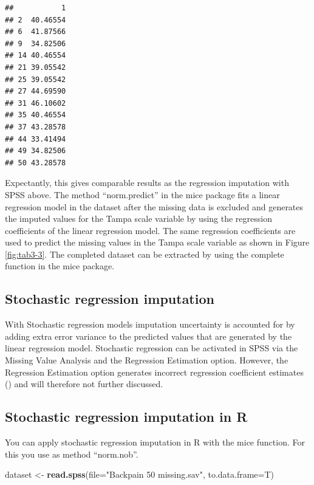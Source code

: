 \documentclass[]{book}
\newenvironment{Shaded}{\begin{snugshade}}{\end{snugshade}}
\newcommand{\KeywordTok}[1]{\textcolor[rgb]{0.13,0.29,0.53}{\textbf{#1}}}
\newcommand{\DataTypeTok}[1]{\textcolor[rgb]{0.13,0.29,0.53}{#1}}
\newcommand{\StringTok}[1]{\textcolor[rgb]{0.31,0.60,0.02}{#1}}
\newcommand{\NormalTok}[1]{#1}
\theoremstyle{definition}
\theoremstyle{definition}
\theoremstyle{definition}
\theoremstyle{remark}
\begin{document}
\begin{verbatim}
##           1
## 2  40.46554
## 6  41.87566
## 9  34.82506
## 14 40.46554
## 21 39.05542
## 25 39.05542
## 27 44.69590
## 31 46.10602
## 35 40.46554
## 37 43.28578
## 44 33.41494
## 49 34.82506
## 50 43.28578
\end{verbatim}

Expectantly, this gives comparable results as the regression imputation
with SPSS above. The method ``norm.predict'' in the mice package fits a
linear regression model in the dataset after the missing data is
excluded and generates the imputed values for the Tampa scale variable
by using the regression coefficients of the linear regression model. The
same regression coefficients are used to predict the missing values in
the Tampa scale variable as shown in Figure \ref{fig:tab3-3}. The
completed dataset can be extracted by using the complete function in the
mice package.

\subsection{Stochastic regression
imputation}\label{stochastic-regression-imputation}

With Stochastic regression models imputation uncertainty is accounted
for by adding extra error variance to the predicted values that are
generated by the linear regression model. Stochastic regression can be
activated in SPSS via the Missing Value Analysis and the Regression
Estimation option. However, the Regression Estimation option generates
incorrect regression coefficient estimates (\citet{hippel1}) and will
therefore not further discussed.

\subsection{Stochastic regression imputation in
R}\label{stochastic-regression-imputation-in-r}

You can apply stochastic regression imputation in R with the mice
function. For this you use as method ``norm.nob''.

\begin{Shaded}
\begin{Highlighting}[]
\NormalTok{dataset <-}\StringTok{ }\KeywordTok{read.spss}\NormalTok{(}\DataTypeTok{file=}\StringTok{"Backpain 50 missing.sav"}\NormalTok{, }\DataTypeTok{to.data.frame=}\NormalTok{T)}
\end{Highlighting}
\end{Shaded}
\end{document}
